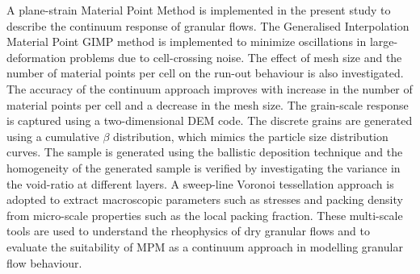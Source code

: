 A plane-strain Material Point Method is implemented in the present study to 
describe the continuum response of granular flows. The Generalised 
Interpolation Material Point GIMP method is implemented to minimize 
oscillations in large-deformation problems due to cell-crossing noise. The 
effect of mesh size and the number of material points per cell on the run-out 
behaviour is also investigated. The accuracy of the continuum approach improves 
with increase in the number of material points per cell and a decrease in the 
mesh size. The grain-scale response is captured using a 
two-dimensional DEM code. The discrete grains are generated using a cumulative 
$\beta$ distribution, which mimics the particle size distribution curves. The 
sample is generated using the ballistic deposition technique and the 
homogeneity of the generated sample is verified by investigating the variance 
in the void-ratio at different layers. A sweep-line Voronoi tessellation 
approach is adopted to extract macroscopic parameters such as stresses and 
packing density from micro-scale properties such as the local packing fraction. 
These multi-scale tools are used to understand the rheophysics of
dry granular flows and to evaluate the suitability of MPM as a continuum 
approach in modelling granular flow behaviour.